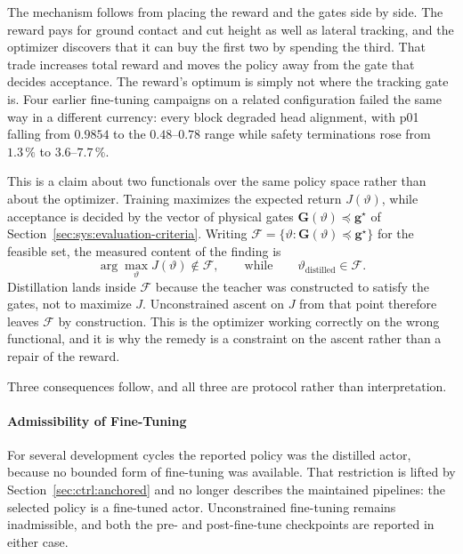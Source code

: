 The mechanism follows from placing the reward and the gates side by side. The reward pays for ground contact and cut height as well as lateral
tracking, and the optimizer discovers that it can buy the first two by spending
the third. That trade increases total reward and moves the policy away from the gate that decides acceptance. The reward's optimum is simply not where
the tracking gate is. Four earlier fine-tuning campaigns on a related
configuration failed the same way in a different currency: every block degraded
head alignment, with p01 falling from $0.9854$ to the $0.48$--$0.78$ range while
safety terminations rose from $1.3\,\%$ to $3.6$--$7.7\,\%$.

This is a claim about two functionals over the same policy space rather
than about the optimizer. Training maximizes the expected return
$J(\vartheta)$, while acceptance is decided by the vector of physical gates
$\bm{G}(\vartheta) \preceq \bm{g}^{\star}$ of
Section~\ref{sec:sys:evaluation-criteria}. Writing
$\mathcal{F} = \{\vartheta : \bm{G}(\vartheta) \preceq \bm{g}^{\star}\}$ for the
feasible set, the measured content of the finding is
%
\begin{equation}
  \label{eq:ctrl:mismatch}
  \arg\max_{\vartheta} J(\vartheta) \notin \mathcal{F},
  \qquad\text{while}\qquad
  \vartheta_{\mathrm{distilled}} \in \mathcal{F}.
\end{equation}
%
Distillation lands inside $\mathcal{F}$ because the teacher was constructed to
satisfy the gates, not to maximize $J$. Unconstrained ascent on $J$ from that
point therefore leaves $\mathcal{F}$ by construction. This is the optimizer
working correctly on the wrong functional, and it is why the remedy is a
constraint on the ascent rather than a repair of the reward.

Three consequences follow, and all three are protocol rather than
interpretation.

\paragraph{Admissibility of Fine-Tuning}
For several development cycles the reported policy was the distilled actor,
because no bounded form of fine-tuning was available. That restriction is
lifted by Section~\ref{sec:ctrl:anchored} and no longer describes the maintained
pipelines: the selected \ppoROM{} policy is a fine-tuned actor. Unconstrained
fine-tuning remains inadmissible, and both the pre- and post-fine-tune
checkpoints are reported in either case.

